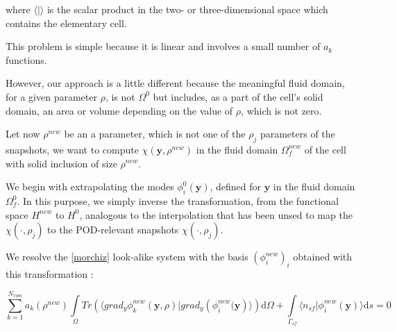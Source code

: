 where $\langle |\rangle$ is the scalar product in the two- or three-dimensional space which contains the elementary cell.

\par
This problem is simple because it is linear and involves a small number of $a_k$ functions.%


\etoile
However, our approach is a little different because the meaningful fluid domain, for a given parameter $\rho$, %
is not $\Omega^0$ but includes, as a part of the cell's solid domain, an area or volume depending on the value of $\rho$, %
which is not zero.

\par
Let now $\rho^{new}$ be an a parameter, which is not one of the $\rho_j$ parameters of the snapshots, %
we want to compute $\chi(\mathbf{y},\rho^{new})$ in the fluid domain $\Omega_f^{new}$ of the cell with solid inclusion of size $\rho^{new}$.

\par
We begin with extrapolating the modes $\phi_i^0(\mathbf{y})$, defined for $\mathbf{y}$ in the fluid domain $\Omega_f^0$. %
In this purpose, we simply inverse the transformation, from the functional space $H^{new}$ to $H^0$, %
analogous to the interpolation that has been unsed to map the $\chi(\cdot,\rho_j)$ to the POD-relevant snapshots $\chi (\cdot ,\rho_j)$.

\par
We resolve the \ref{morchiz} look-alike system with the basis $(\phi_i^{new})_i$ obtained with this transformation :

\begin{equation}
\sum\limits_{k=1}^{N_{rom}} a_k(\rho^{new})\int\limits_{\Omega}Tr\left(\langle grad_y\phi_k^{new} \left(\mathbf{y},\rho\right)|grad_y\left(\phi_i^{new}(\mathbf{y}\right)\rangle\right)\text{d}\Omega+%
\int\limits_{\Gamma_{sf}}\langle n_{sf}|\phi_i^{new}(\mathbf{y})\rangle \text{d}s %
=0
\label{morchi}
\end{equation}

